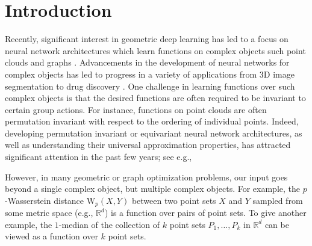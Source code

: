 \documentclass[12pt]{article}
\newcommand{\R}{\mathbb R}
\begin{document}
\section{Introduction}
\label{section:introduction}
Recently, significant interest in geometric deep learning has led to a focus on neural network architectures which learn functions on complex objects such point clouds \citep{zaheer2017deep, qi2017pointnet} and graphs \citep{scarselli2008graph}. 
Advancements in the development of neural networks for complex objects has led to progress in a variety of applications from 3D image segmentation \citep{uy2019revisiting} to drug discovery \citep{bongini2021molecular, gilmer2017neural}.
One challenge in learning functions over such complex objects is that the desired functions are often required to be invariant to certain group actions.
For instance, functions on point clouds are often permutation invariant with respect to the ordering of individual points.
Indeed, developing permutation invariant or equivariant neural network architectures, as well as understanding their universal approximation properties, has attracted significant attention in the past few years; see e.g., \citep{qi2017pointnet, zaheer2017deep, maron2018invariant, maron2019universality, segol2019universal, keriven2019universal, yarotsky2022universal, wagstaff2019limitations, wagstaff2022universal, bueno2021representation}

However, in many geometric or graph optimization problems, our input goes beyond a single complex object, but multiple complex objects. 
For example, the $p$-Wasserstein distance $\mathrm{W}_p(X, Y)$ between two point sets $X$ and $Y$ sampled from some metric space (e.g., $\mathbb{R}^d$) is a function over pairs of point sets. 
To give another example, the $1$-median of the collection of $k$ point sets $P_1, \dots, P_k$ in $\R^d$ can be viewed as a function over $k$ point sets. 
\end{document}
